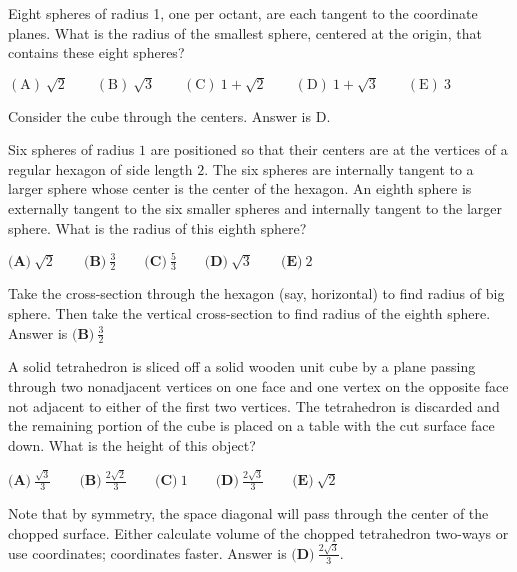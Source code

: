 \documentclass[11pt,twoside]{scrartcl}
\begin{document}
\begin{problem}[2005 AMC 12 B, \#16]
    Eight spheres of radius 1, one per octant, are each tangent to the coordinate planes. What is the radius of the smallest sphere, centered at the origin, that contains these eight spheres?

$\mathrm {(A)}\ \sqrt{2}  \qquad \mathrm {(B)}\ \sqrt{3}  \qquad \mathrm {(C)}\ 1+\sqrt{2}\qquad \mathrm {(D)}\ 1+\sqrt{3}\qquad \mathrm {(E)}\ 3$


    \begin{sketch}
       Consider the cube through the centers. Answer is $\boxed{\text{D}}.$
    \end{sketch}
\end{problem}


\begin{problem}[2013 AMC 10 A, \#22]
    Six spheres of radius $1$ are positioned so that their centers are at the vertices of a regular hexagon of side length $2$. The six spheres are internally tangent to a larger sphere whose center is the center of the hexagon. An eighth sphere is externally tangent to the six smaller spheres and internally tangent to the larger sphere. What is the radius of this eighth sphere?

    $\textbf{(A)} \ \sqrt{2} \qquad \textbf{(B)} \ \frac{3}{2} \qquad \textbf{(C)} \ \frac{5}{3} \qquad \textbf{(D)} \ \sqrt{3} \qquad \textbf{(E)} \ 2$


    \begin{sketch}
       Take the cross-section through the hexagon (say, horizontal) to find radius of big sphere. Then take the vertical cross-section to find radius of the eighth sphere. Answer is $\boxed{\textbf{(B)} \ \frac{3}{2}}$
    \end{sketch}
\end{problem}

\begin{problem}[2012 AMC 10 B, \#23]
    A solid tetrahedron is sliced off a solid wooden unit cube by a plane passing through two nonadjacent vertices on one face and one vertex on the opposite face not adjacent to either of the first two vertices. The tetrahedron is discarded and the remaining portion of the cube is placed on a table with the cut surface face down. What is the height of this object?

$\textbf{(A)}\ \frac{\sqrt{3}}{3} \qquad\textbf{(B)}\ \frac{2 \sqrt{2}}{3}\qquad\textbf{(C)}\ 1\qquad\textbf{(D)}\ \frac{2 \sqrt{3}}{3}\qquad\textbf{(E)}\ \sqrt{2}$
    \begin{sketch}
        Note that by symmetry, the space diagonal will pass through the center of the chopped surface. Either calculate volume of the chopped tetrahedron two-ways or use coordinates; coordinates faster. Answer is $\boxed{\textbf{(D)}\ \frac{2 \sqrt{3}}{3}}.$
    \end{sketch}
\end{problem}
\end{document}
